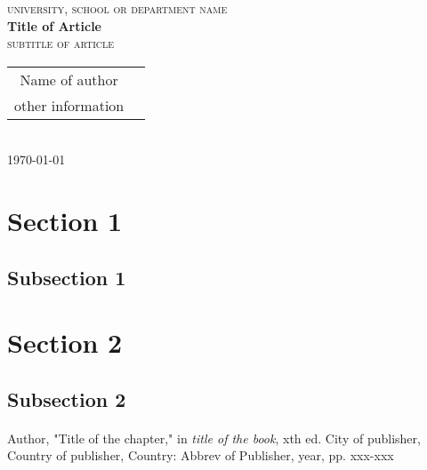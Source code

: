 \documentclass[10pt, a4paper, oneside]{article}
\begin{document}
\thispagestyle{empty}
\begin{center}
  \textsc{university, school or department name} \\ [60pt] 

  \textbf{{\LARGE Title of Article}} \\ [1pt]
  \textsc{{\large subtitle of article }} \\ [20pt]

  \begin{tabular}{cc}
    Name of author  \\
    other information
  \end{tabular} \\ [20pt]
  \today \\
\end{center}

\tableofcontents

\newpage

\begin{abstract}

\end{abstract}

\newpage

\section{Section 1}
\subsection{Subsection 1}
\paragraph{}
\paragraph{}
\paragraph{}

\section{Section 2}
\subsection{Subsection 2}
\paragraph{}
\paragraph{}
\paragraph{}
      
\begin{thebibliography}{9}

  Author,
  "Title of the chapter," in 
  \emph{title of the book},
  xth ed.
  City of publisher,
  Country of publisher,
  Country:
  Abbrev of Publisher,
  year,
  pp. xxx-xxx

\end{thebibliography}      
      
\end{document}
